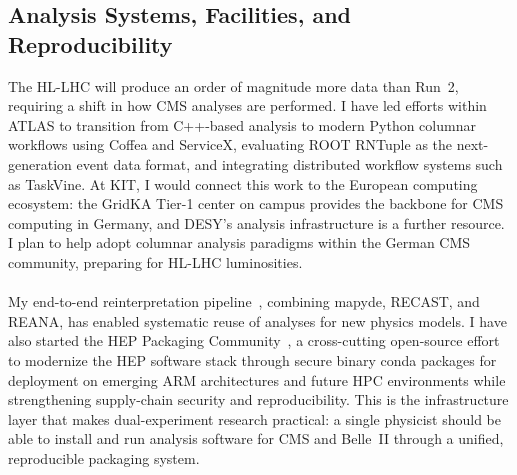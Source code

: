 \documentclass[10pt,a4paper,sans]{moderncv} %
\begin{document}
\subsection{Analysis Systems, Facilities, and Reproducibility}
The HL-LHC will produce an order of magnitude more data than Run~2, requiring a shift in how CMS analyses are performed. I have led efforts within ATLAS to transition from C++-based analysis to modern Python columnar workflows using Coffea and ServiceX, evaluating ROOT RNTuple as the next-generation event data format, and integrating distributed workflow systems such as TaskVine. At KIT, I would connect this work to the European computing ecosystem: the GridKA Tier-1 center on campus provides the backbone for CMS computing in Germany, and DESY's analysis infrastructure is a further resource. I plan to help adopt columnar analysis paradigms within the German CMS community, preparing for HL-LHC luminosities.
\\
\\
My end-to-end reinterpretation pipeline~\cite{10.21468/SciPostPhysCodeb.27}, combining mapyde, RECAST, and REANA, has enabled systematic reuse of analyses for new physics models. I have also started the HEP Packaging Community~\cite{HEPPackaging2025}, a cross-cutting open-source effort to modernize the HEP software stack through secure binary conda packages for deployment on emerging ARM architectures and future HPC environments while strengthening supply-chain security and reproducibility. This is the infrastructure layer that makes dual-experiment research practical: a single physicist should be able to install and run analysis software for CMS and Belle~II through a unified, reproducible packaging system.
\end{document}
